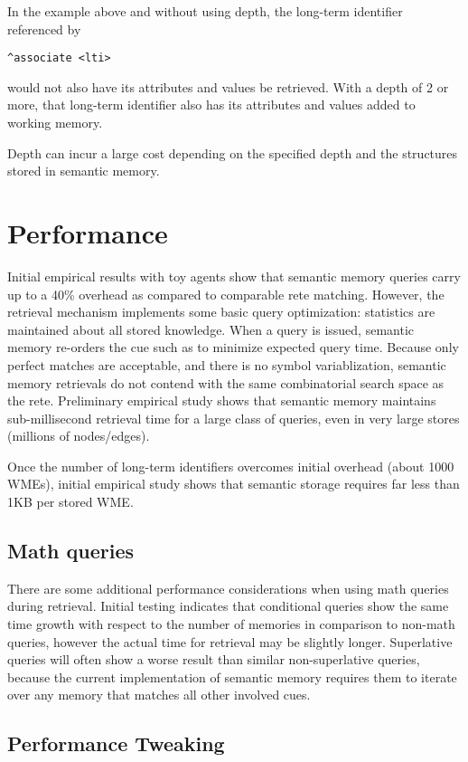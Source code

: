 In the example above and without using depth, the long-term identifier referenced by
\begin{verbatim}
^associate <lti>
\end{verbatim}
would not also have its attributes and values be retrieved. With a depth of 2 or more, that long-term identifier also has its attributes and values added to working memory.

Depth can incur a large cost depending on the specified depth and the structures stored in semantic memory.

\section{Performance}
\label{SMEM-perf}

Initial empirical results with toy agents show that semantic memory queries carry up to a 40\% overhead as compared to comparable rete matching.  
However, the retrieval mechanism implements some basic query optimization: statistics are maintained about all stored knowledge.  
When a query is issued, semantic memory re-orders the cue such as to minimize expected query time.  
Because only perfect matches are acceptable, and there is no symbol variablization, semantic memory retrievals do not contend with the same combinatorial search space as the rete.  
Preliminary empirical study shows that semantic memory maintains sub-millisecond retrieval time for a large class of queries, even in very large stores (millions of nodes/edges).

Once the number of long-term identifiers overcomes initial overhead (about 1000 WMEs), initial empirical study shows that semantic storage requires far less than 1KB per stored WME.

\subsection{Math queries}
There are some additional performance considerations when using math queries during retrieval.
Initial testing indicates that conditional queries show the same time growth with respect to the number of memories in comparison to non-math queries, however the actual time for retrieval may be slightly longer.
Superlative queries will often show a worse result than similar non-superlative queries, because the current implementation of semantic memory requires them to iterate over any memory that matches all other involved cues.

\subsection{Performance Tweaking}


